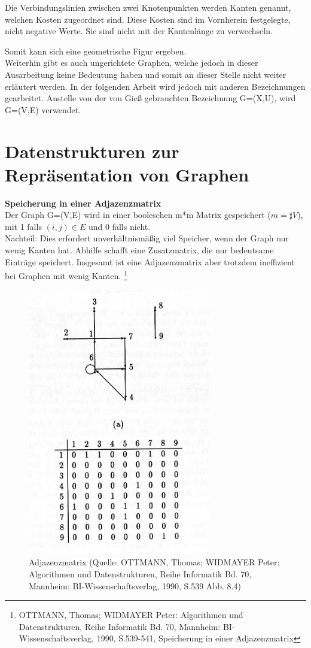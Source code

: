 Die Verbindungslinien zwischen zwei Knotenpunkten werden Kanten genannt, welchen Kosten zugeordnet sind. Diese Kosten sind im Vornherein festgelegte, nicht negative Werte. Sie sind  nicht mit der Kantenlänge zu verwechseln.

Somit kann sich eine geometrische Figur ergeben.\\

Weiterhin gibt es auch ungerichtete Graphen, welche jedoch in dieser Ausarbeitung keine Bedeutung haben und somit an dieser Stelle nicht weiter erläutert werden.
In der folgenden Arbeit wird jedoch mit anderen Bezeichnungen gearbeitet. Anstelle von der von Gieß gebrauchten Bezeichnung G=(X,U), wird G=(V,E) verwendet.



\section{Datenstrukturen zur Repräsentation von Graphen}

\textbf{Speicherung in einer Adjazenzmatrix} \\
Der Graph G=(V,E) wird in einer booleschen m*m Matrix gespeichert ($m = \sharp V$), mit 1 falls $(i,j) \in E$ und 0 falls nicht. \\
Nachteil: Dies erfordert unverhältnismäßig viel Speicher, wenn der Graph nur wenig    	  Kanten hat. Abhilfe schafft eine Zusatzmatrix, die nur bedeutsame Einträge speichert.
 Insgesamt ist eine Adjazenzmatrix aber trotzdem ineffizient bei Graphen mit wenig Kanten. 
  \footnote{OTTMANN, Thomas; WIDMAYER Peter: Algorithmen und Datenstrukturen, Reihe Informatik Bd. 70, Mannheim: BI-Wissenschaftsverlag, 1990, S.539-541, Speicherung in einer Adjazenzmatrix}\\
 

\begin{figure}[h]
\centering
\includegraphics[width = 8cm]{./chapters/adjazenzmatrix.jpg}
\caption{Adjazenzmatrix {\tiny (Quelle: OTTMANN, Thomas; WIDMAYER Peter: Algorithmen und Datenstrukturen, Reihe Informatik Bd. 70, Mannheim: BI-Wissenschaftsverlag, 1990, S.539 Abb. 8.4)} }
\label{a2}
\end{figure}
 

